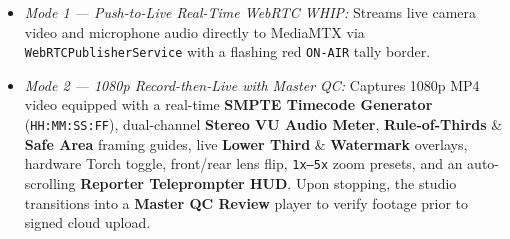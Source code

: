 {\begin{enumerate}[leftmargin=*,itemsep=2pt]
  \begin{itemize}[leftmargin=*,itemsep=1pt]
    \item \emph{Mode 1 --- Push-to-Live Real-Time WebRTC WHIP:} Streams live camera video and microphone audio directly to MediaMTX via \texttt{WebRTCPublisherService} with a flashing red \texttt{ON-AIR} tally border.
    \item \emph{Mode 2 --- 1080p Record-then-Live with Master QC:} Captures 1080p MP4 video equipped with a real-time \textbf{SMPTE Timecode Generator} (\texttt{HH:MM:SS:FF}), dual-channel \textbf{Stereo VU Audio Meter}, \textbf{Rule-of-Thirds} \& \textbf{Safe Area} framing guides, live \textbf{Lower Third} \& \textbf{Watermark} overlays, hardware Torch toggle, front/rear lens flip, \texttt{1x--5x} zoom presets, and an auto-scrolling \textbf{Reporter Teleprompter HUD}. Upon stopping, the studio transitions into a \textbf{Master QC Review} player to verify footage prior to signed cloud upload.
  \end{itemize}
\end{enumerate}
}

